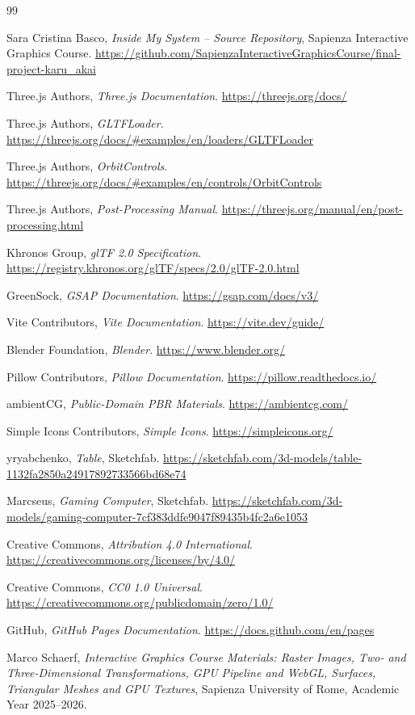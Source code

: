\documentclass{report}
\begin{document}
\clearpage
\begin{thebibliography}{99}

Sara Cristina Basco,
\textit{Inside My System -- Source Repository},
Sapienza Interactive Graphics Course.
\url{https://github.com/SapienzaInteractiveGraphicsCourse/final-project-karu_akai}

Three.js Authors,
\textit{Three.js Documentation}.
\url{https://threejs.org/docs/}

Three.js Authors,
\textit{GLTFLoader}.
\url{https://threejs.org/docs/#examples/en/loaders/GLTFLoader}

Three.js Authors,
\textit{OrbitControls}.
\url{https://threejs.org/docs/#examples/en/controls/OrbitControls}

Three.js Authors,
\textit{Post-Processing Manual}.
\url{https://threejs.org/manual/en/post-processing.html}

Khronos Group,
\textit{glTF 2.0 Specification}.
\url{https://registry.khronos.org/glTF/specs/2.0/glTF-2.0.html}

GreenSock,
\textit{GSAP Documentation}.
\url{https://gsap.com/docs/v3/}

Vite Contributors,
\textit{Vite Documentation}.
\url{https://vite.dev/guide/}

Blender Foundation,
\textit{Blender}.
\url{https://www.blender.org/}

Pillow Contributors,
\textit{Pillow Documentation}.
\url{https://pillow.readthedocs.io/}

ambientCG,
\textit{Public-Domain PBR Materials}.
\url{https://ambientcg.com/}

Simple Icons Contributors,
\textit{Simple Icons}.
\url{https://simpleicons.org/}

yryabchenko,
\textit{Table},
Sketchfab.
\url{https://sketchfab.com/3d-models/table-1132fa2850a24917892733566bd68e74}

Marcseus,
\textit{Gaming Computer},
Sketchfab.
\url{https://sketchfab.com/3d-models/gaming-computer-7cf383ddfe9047f89435b4fc2a6e1053}

Creative Commons,
\textit{Attribution 4.0 International}.
\url{https://creativecommons.org/licenses/by/4.0/}

Creative Commons,
\textit{CC0 1.0 Universal}.
\url{https://creativecommons.org/publicdomain/zero/1.0/}

GitHub,
\textit{GitHub Pages Documentation}.
\url{https://docs.github.com/en/pages}

Marco Schaerf,
\textit{Interactive Graphics Course Materials:
Raster Images, Two- and Three-Dimensional Transformations,
GPU Pipeline and WebGL, Surfaces, Triangular Meshes and GPU Textures},
Sapienza University of Rome, Academic Year 2025--2026.

\end{thebibliography}
\end{document}
